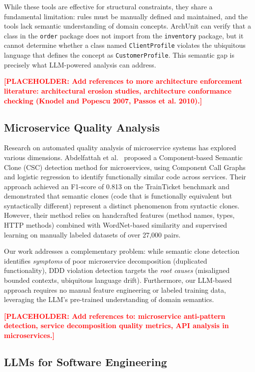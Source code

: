 \documentclass[smallextended]{svjour3}
\newcommand{\placeholder}[1]{\textcolor{red}{\textbf{[PLACEHOLDER: #1]}}}
\begin{document}
While these tools are effective for structural constraints, they share a fundamental limitation: rules must be manually defined and maintained, and the tools lack semantic understanding of domain concepts.
ArchUnit can verify that a class in the \texttt{order} package does not import from the \texttt{inventory} package, but it cannot determine whether a class named \texttt{ClientProfile} violates the ubiquitous language that defines the concept as \texttt{CustomerProfile}.
This semantic gap is precisely what LLM-powered analysis can address.

\placeholder{Add references to more architecture enforcement literature: architectural erosion studies, architecture conformance checking (Knodel and Popescu 2007, Passos et al. 2010).}

\subsection{Microservice Quality Analysis}
\label{sec:bg_microservice_quality}

Research on automated quality analysis of microservice systems has explored various dimensions.
Abdelfattah et al.~\cite{abdelfattah2023semantic} proposed a Component-based Semantic Clone (CSC) detection method for microservices, using Component Call Graphs and logistic regression to identify functionally similar code across services.
Their approach achieved an F1-score of 0.813 on the TrainTicket benchmark and demonstrated that semantic clones (code that is functionally equivalent but syntactically different) represent a distinct phenomenon from syntactic clones.
However, their method relies on handcrafted features (method names, types, HTTP methods) combined with WordNet-based similarity and supervised learning on manually labeled datasets of over 27,000 pairs.

Our work addresses a complementary problem: while semantic clone detection identifies \emph{symptoms} of poor microservice decomposition (duplicated functionality), DDD violation detection targets the \emph{root causes} (misaligned bounded contexts, ubiquitous language drift).
Furthermore, our LLM-based approach requires no manual feature engineering or labeled training data, leveraging the LLM's pre-trained understanding of domain semantics.

\placeholder{Add references to: microservice anti-pattern detection, service decomposition quality metrics, API analysis in microservices.}

\subsection{LLMs for Software Engineering}
\label{sec:bg_llm_se}
\end{document}
